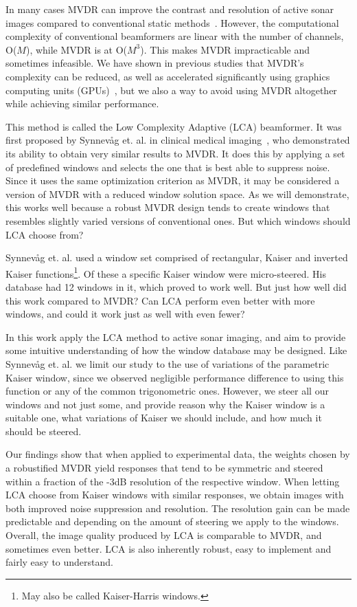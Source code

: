 \documentclass[10pt,journal,draftclsnofoot,onecolumn]{IEEEtran}
\newcommand\1{\vec 1}
\begin{document}
In many cases MVDR can improve the contrast and resolution of active sonar images compared to conventional static methods~\cite{Blomberg2013,Blomberg2012a,Dursun2009,Lo2004}. However, the computational complexity of conventional beamformers are linear with the number of channels, O($M$), while MVDR is at O($M^3$). This makes MVDR impracticable and sometimes infeasible. We have shown in previous studies that MVDR's complexity can be reduced, as well as accelerated significantly using graphics computing units (GPUs)~\cite{Buskenes2014,Asen2013}, but we also a way to avoid using MVDR altogether while achieving similar performance.

This method is called the Low Complexity Adaptive (LCA) beamformer. It was first proposed by Synnev\aa{}g et. al. in clinical medical imaging~\cite{Synnevag2008}, who demonstrated its ability to obtain very similar results to MVDR. It does this by applying a set of predefined windows and selects the one that is best able to suppress noise. Since it uses the same optimization criterion as MVDR, it may be considered a version of MVDR with a reduced window solution space. As we will demonstrate, this works well because a robust MVDR design tends to create windows that resembles slightly varied versions of conventional ones. But which windows should LCA choose from?

Synnev\aa{}g et. al. used a window set comprised of rectangular, Kaiser and inverted Kaiser functions\footnote{May also be called Kaiser-Harris windows.}. Of these a specific Kaiser window were micro-steered. His database had 12 windows in it, which proved to work well. But just how well did this work compared to MVDR? Can LCA perform even better with more windows, and could it work just as well with even fewer? 

In this work apply the LCA method to active sonar imaging, and aim to provide some intuitive understanding of how the window database may be designed. Like Synnev\aa{}g et. al. we limit our study to the use of variations of the parametric Kaiser window, since we observed negligible performance difference to using this function or any of the common trigonometric ones. However, we steer all our windows and not just some, and provide reason why the Kaiser window is a suitable one, what variations of Kaiser we should include, and how much it should be steered. 

Our findings show that when applied to experimental data, the weights chosen by a robustified MVDR yield responses that tend to be symmetric and steered within a fraction of the -3dB resolution of the respective window. When letting LCA choose from Kaiser windows with similar responses, we obtain images with both improved noise suppression and resolution. The resolution gain can be made predictable and depending on the amount of steering we apply to the windows. Overall, the image quality produced by LCA is comparable to MVDR, and sometimes even better. LCA is also inherently robust, easy to implement and fairly easy to understand.
\end{document}
